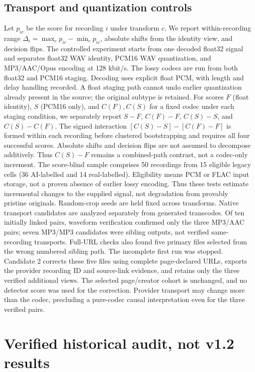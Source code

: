 \documentclass[10pt,a4paper]{article}
\begin{document}
\subsection{Transport and quantization controls}
Let $p_{ic}$ be the score for recording $i$ under transform $c$. We report
within-recording range $\Delta_i=\max_c p_{ic}-\min_c p_{ic}$, absolute shifts
from the identity view, and decision flips. The controlled experiment starts
from one decoded float32 signal and separates float32 WAV identity, PCM16 WAV
quantization, and MP3/AAC/Opus encoding at 128 kbit/s. The lossy codecs are run
from both float32 and PCM16 staging. Decoding uses explicit float PCM, with
length and delay handling recorded. A float staging path cannot undo earlier
quantization already present in the source; the original subtype is retained.
For scores $F$ (float identity), $S$ (PCM16 only), and $C(F),C(S)$ for a fixed
codec under each staging condition, we separately report $S-F$, $C(F)-F$,
$C(S)-S$, and $C(S)-C(F)$. The signed interaction
$[C(S)-S]-[C(F)-F]$ is formed within each recording before clustered
bootstrapping and requires all four successful scores. Absolute shifts and
decision flips are not assumed to decompose additively. Thus $C(S)-F$ remains
a combined-path contrast, not a codec-only increment.
The score-blind sample comprises 50 recordings from 15 eligible legacy cells
(36 AI-labelled and 14 real-labelled). Eligibility means PCM or FLAC input
storage, not a proven absence of earlier lossy encoding. Thus these tests
estimate incremental changes to the supplied signal, not degradation from
provably pristine originals. Random-crop seeds are held fixed across transforms.
Native transport candidates are analyzed separately from generated transcodes.
Of ten initially linked pairs, waveform verification confirmed only the three
MP3/AAC pairs; seven MP3/MP3 candidates were sibling outputs, not verified
same-recording transports. Full-URL checks also found five primary files
selected from the wrong numbered sibling path. The incomplete first run was
stopped. Candidate 2 corrects these five files using complete page-declared
URLs, exports the provider recording ID and source-link evidence, and retains
only the three verified additional views. The selected page/creator cohort is
unchanged, and no detector score was used for the correction.
Provider transport may change more than the codec, precluding a pure-codec
causal interpretation even for the three verified pairs.

\section{Verified historical audit, not v1.2 results}
\end{document}
